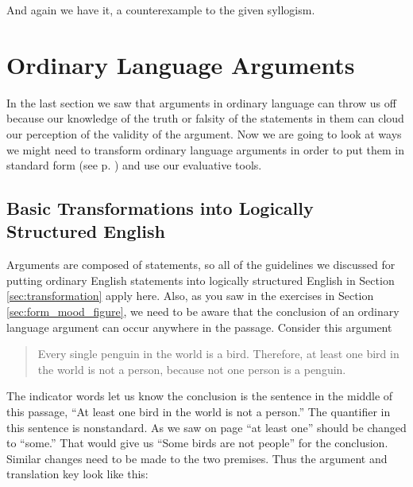 \begin{kormanize}
 \end{kormanize}

And again we have it, a counterexample to the given syllogism.

\section{Ordinary Language Arguments}

In the last section we saw that arguments in ordinary language can throw us off because our knowledge of the truth or falsity of the statements in them can cloud our perception of the validity of the argument. Now we are going to look at ways we might need to transform ordinary language arguments in order to put them in standard form (see p. \pageref{standard_form_for_an_Aristotelian_syllogism}) and use our evaluative tools.

\subsection{Basic Transformations into Logically Structured English}

Arguments are composed of statements, so all of the guidelines we discussed for putting ordinary English statements into logically structured English in Section \ref{sec:transformation} apply here. Also, as you saw in the exercises in Section \ref{sec:form_mood_figure}, we need to be aware that the conclusion of an ordinary language argument can occur anywhere in the passage. Consider this argument

\begin{quotation}
\noindent Every single penguin in the world is a bird. Therefore, at least one bird in the world is not a person, because not one person is a penguin.
\end{quotation}

The indicator words let us know the conclusion is the sentence in the middle of this passage, ``At least one bird in the world is not a person.'' The quantifier in this sentence is nonstandard. As we saw on page \pageref{subsec:nonstandard_quantifiers} ``at least one'' should be changed to ``some.'' That would give us ``Some birds are not people'' for the conclusion. Similar changes need to be made to the two premises. Thus the argument and translation key look like this:

